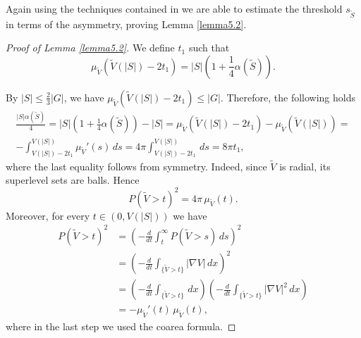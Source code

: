 \documentclass[oneside,a4paper,11pt,notitlepage]{article}
\newcommand{\abs}[1]{{\left|#1\right|}}
\theoremstyle{definition}
\theoremstyle{plain}
\theoremstyle{definition}
\begin{document}
Again using the techniques contained in \cite{Kim} we are able to estimate the threshold $s_{\tilde S}$ in terms of the asymmetry, proving Lemma \ref{lemma5.2}.
\begin{proof}[Proof of Lemma \ref{lemma5.2}]
    We define $t_1$ such that
    \begin{equation*}
        \mu_{\tilde V}(\tilde V(\abs{S})-2t_1)=\abs{S}\left(1+\frac{1}{4}\alpha(\tilde{S})\right).
    \end{equation*}

        By $\abs{S} \leq \frac{2}{3}\abs{G}$, we have $ \mu_{\tilde V}(\tilde V(\abs{S})-2t_1) \leq \abs{G}$. Therefore,  the following  holds
    \begin{equation*}
        \begin{aligned}
            \frac{\abs{S}\alpha(\tilde{S})}{4}=\abs{S}\left(1+\frac{1}{4}\alpha(\tilde{S})\right)-\abs{S}=\mu_{\tilde V}(\tilde V(\abs{S})-2t_1)-\mu_{\tilde V}(\tilde V(\abs{S}))=\\-\int_{V(\abs{S})-2t_1}^{V(\abs{S})}\mu_{\tilde V}'(s)\,ds=4\pi\int_{V(\abs{S})-2t_1}^{V(\abs{S})}\,ds=8\pi t_1,
        \end{aligned}
    \end{equation*}
 where the last equality follows from symmetry. Indeed, since $\tilde V$ is radial, its superlevel sets are balls. Hence
\begin{equation*}
P(\tilde V>t)^2 = 4\pi\,\mu_{\tilde V}(t).
\end{equation*}
Moreover, for every $t \in (0, V(|S|))$ we have
\begin{equation*}
\begin{aligned}
P(\tilde V>t)^2
&=\left(-\frac{d}{dt}\int_t^\infty P(\tilde V>s)\,ds\right)^2 \\
&=\left(-\frac{d}{dt}\int_{\{\tilde V>t\}}|\nabla V|\,dx\right)^2 \\
&=\left(-\frac{d}{dt}\int_{\{\tilde V>t\}} \,dx\right)
  \left(-\frac{d}{dt}\int_{\{\tilde V>t\}} |\nabla V|^2\,dx\right) \\
&= -\mu_{\tilde V}'(t)\,\mu_{\tilde V}(t),
\end{aligned}
\end{equation*}
where in the last step we used the coarea formula.


\end{proof}
\end{document}
